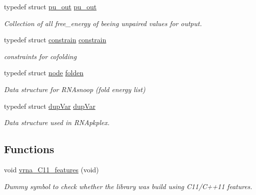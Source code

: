 \begin{DoxyCompactItemize}
\mbox{\label{group__data__structures_ga501763bd204b60f40e3ab68b40023023}} 
typedef struct \mbox{\hyperlink{group__data__structures_structpu__out}{pu\+\_\+out}} \mbox{\hyperlink{group__data__structures_ga501763bd204b60f40e3ab68b40023023}{pu\+\_\+out}}
\begin{DoxyCompactList}\small\item\em Collection of all free\+\_\+energy of beeing unpaired values for output. \end{DoxyCompactList}\item 
\mbox{\label{group__data__structures_ga212e3afb0cc299acdfb1ec976435686e}} 
typedef struct \mbox{\hyperlink{group__data__structures_structconstrain}{constrain}} \mbox{\hyperlink{group__data__structures_ga212e3afb0cc299acdfb1ec976435686e}{constrain}}
\begin{DoxyCompactList}\small\item\em constraints for cofolding \end{DoxyCompactList}\item 
\mbox{\label{group__data__structures_gaaf402058651c8218fa72788d591cda05}} 
typedef struct \mbox{\hyperlink{group__data__structures_structnode}{node}} \mbox{\hyperlink{group__data__structures_gaaf402058651c8218fa72788d591cda05}{folden}}
\begin{DoxyCompactList}\small\item\em Data structure for R\+N\+Asnoop (fold energy list) \end{DoxyCompactList}\item 
\mbox{\label{group__data__structures_gabd3b93f9aaa9f3acce2d148bae97d24e}} 
typedef struct \mbox{\hyperlink{group__data__structures_structdupVar}{dup\+Var}} \mbox{\hyperlink{group__data__structures_gabd3b93f9aaa9f3acce2d148bae97d24e}{dup\+Var}}
\begin{DoxyCompactList}\small\item\em Data structure used in R\+N\+Apkplex. \end{DoxyCompactList}\end{DoxyCompactItemize}
\subsection*{Functions}
\begin{DoxyCompactItemize}
\item 
void \mbox{\hyperlink{group__data__structures_ga21744ae2d6a17309f9327d3547cef0cb}{vrna\+\_\+\+C11\+\_\+features}} (void)
\begin{DoxyCompactList}\small\item\em Dummy symbol to check whether the library was build using C11/\+C++11 features. \end{DoxyCompactList}\end{DoxyCompactItemize}


